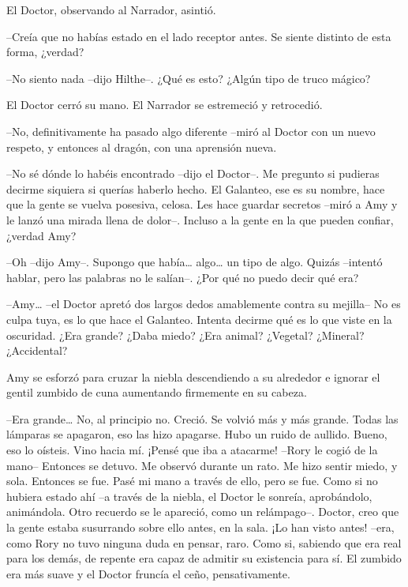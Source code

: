 {El Doctor, observando al Narrador, asintió.}

{--Creía que no habías estado en el lado receptor antes. Se siente
distinto de esta forma, ¿verdad?}

{--No siento nada --dijo Hilthe--. ¿Qué es esto? ¿Algún tipo de truco
mágico?}

{El Doctor cerró su mano. El Narrador se estremeció y retrocedió.}

{--No, definitivamente ha pasado algo diferente --miró al Doctor con
un nuevo respeto, y entonces al dragón, con una aprensión nueva.}

{--No sé dónde lo habéis encontrado --dijo el Doctor--. Me pregunto si
	pudieras decirme siquiera si querías haberlo hecho. El Galanteo, ese es
	su nombre, hace que la gente se vuelva posesiva, celosa. Les hace
	guardar secretos --miró a Amy y le lanzó una mirada llena de dolor--.
Incluso a la gente en la que pueden confiar, ¿verdad Amy?}

{--Oh --dijo Amy--. Supongo que había\ldots{} algo\ldots{} un tipo de
	algo. Quizás --intentó hablar, pero las palabras no le salían--. ¿Por
qué no puedo decir qué era?}

{--Amy\ldots{} --el Doctor apretó dos largos dedos amablemente contra
	su mejilla-- No es culpa tuya, es lo que hace el Galanteo. Intenta
	decirme qué es lo que viste en la oscuridad. ¿Era grande? ¿Daba miedo?
¿Era animal? ¿Vegetal? ¿Mineral? ¿Accidental?}

{Amy se esforzó para cruzar la niebla descendiendo a su alrededor e
ignorar el gentil zumbido de cuna aumentando firmemente en su cabeza.}

{--Era grande\ldots{} No, al principio no. Creció. Se volvió más y más
	grande. Todas las lámparas se apagaron, eso las hizo apagarse. Hubo un
	ruido de aullido. Bueno, eso lo oísteis. Vino hacia mí. ¡Pensé que iba a
	atacarme! --Rory le cogió de la mano-- Entonces se detuvo. Me observó
	durante un rato. Me hizo sentir miedo, y sola. Entonces se fue. Pasé mi
	mano a través de ello, pero se fue. Como si no hubiera estado ahí --a
	través de la niebla, el Doctor le sonreía, aprobándolo, animándola. Otro
	recuerdo se le apareció, como un relámpago--. Doctor, creo que la gente
	estaba susurrando sobre ello antes, en la sala. ¡Lo han visto antes!
	--era, como Rory no tuvo ninguna duda en pensar, raro. Como si, sabiendo
	que era real para los demás, de repente era capaz de admitir su
	existencia para sí. El zumbido era más suave y el Doctor fruncía el
ceño, pensativamente.}

